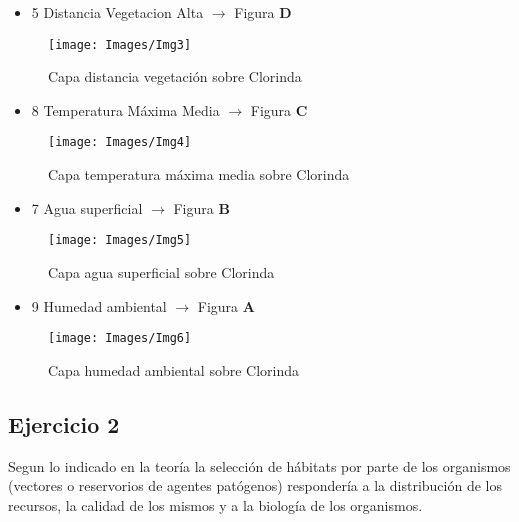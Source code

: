 \begin{itemize}
	\item 5 Distancia Vegetacion Alta $\rightarrow$ Figura \textbf{D}
\end{itemize}

\begin{figure}[H]
	\centering
	\texttt{[image: Images/Img3]}
	\caption{Capa distancia vegetación sobre Clorinda}
	\label{fig:img3}
\end{figure}

\begin{itemize}
	\item 8 Temperatura Máxima Media $\rightarrow$ Figura \textbf{C}
\end{itemize}


\begin{figure}[H]
	\centering
	\texttt{[image: Images/Img4]}
	\caption{Capa temperatura máxima media sobre Clorinda}
	\label{fig:img4}
\end{figure}

\begin{itemize}
	\item 7 Agua superficial $\rightarrow$ Figura \textbf{B}
\end{itemize}


\begin{figure}[H]
	\centering
	\texttt{[image: Images/Img5]}
	\caption{Capa agua superficial sobre Clorinda}
	\label{fig:img5}
\end{figure}


\begin{itemize}
	\item 9 Humedad ambiental $\rightarrow$ Figura \textbf{A}
\end{itemize}

\begin{figure}[H]
	\centering
	\texttt{[image: Images/Img6]}
	\caption{Capa humedad ambiental sobre Clorinda}
	\label{fig:img6}
\end{figure}

\subsection{Ejercicio 2}
Segun lo indicado en la teoría la selección de hábitats por parte de los organismos (vectores o reservorios de agentes patógenos) respondería a la distribución de los recursos, la calidad de los mismos y a la biología de los organismos.

